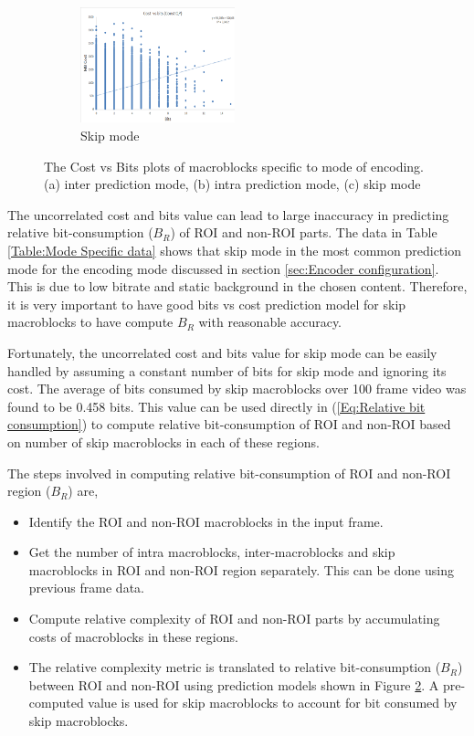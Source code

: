 \documentclass[11pt]{article} %
\begin{document}
\begin{figure}
	\begin{subfigure}[t]{\textwidth}
		\centering
		\includegraphics[width=0.49\textwidth]{CostVsBits/const_QP/CostvsBits_ConstQP_skip.png}
		\caption{Skip mode}
		\label{fig: Cost vs bits mode skip}
	\end{subfigure}
	\caption{The Cost vs Bits plots of macroblocks specific to mode of encoding. (a) inter prediction mode, (b) intra prediction mode, (c) skip mode}
	\label{fig: Cost vs bits mode}
\end{figure}
 
The uncorrelated cost and bits value can lead to large inaccuracy in predicting relative bit-consumption ($B_R$) of ROI and non-ROI parts. The data in Table \ref{Table:Mode Specific data} shows that skip mode in the most common prediction mode for the encoding mode discussed in section \ref{sec:Encoder configuration}. This is due to low bitrate and static background in the chosen content. Therefore, it is very important to have good bits vs cost prediction model for skip macroblocks to have compute $B_R$ with reasonable accuracy.

Fortunately, the uncorrelated cost and bits value for skip mode can be easily handled by assuming a constant number of bits for skip mode and ignoring its cost. The average of bits consumed by skip macroblocks over 100 frame video was found to be 0.458 bits. This value can be used directly in (\ref{Eq:Relative bit consumption}) to compute relative bit-consumption of ROI and non-ROI based on number of skip macroblocks in each of these regions.

The steps involved in computing relative bit-consumption of ROI and non-ROI region ($B_R$) are,
\begin{itemize}
	\item Identify the ROI and non-ROI macroblocks in the input frame.
	\item Get the number of intra macroblocks, inter-macroblocks and skip macroblocks in ROI and non-ROI region separately. This can be done using previous frame data.
	\item Compute relative complexity of ROI and non-ROI parts by accumulating costs of macroblocks in these regions.
	\item The relative complexity metric is translated to relative bit-consumption ($B_R$) between ROI and non-ROI using  prediction models shown in Figure \ref{fig: Cost vs bits mode}. A pre-computed value is used for skip macroblocks to account for bit consumed by skip macroblocks.
\end{itemize}
\end{document}
